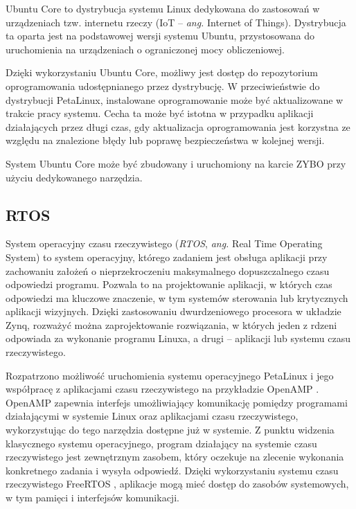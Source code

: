 Ubuntu Core to dystrybucja systemu Linux dedykowana do zastosowań w urządzeniach tzw. internetu rzeczy (IoT -- \emph{ang.} Internet of Things). %
Dystrybucja ta oparta jest na podstawowej wersji systemu Ubuntu, przystosowana do uruchomienia na urządzeniach o ograniczonej mocy obliczeniowej.

Dzięki wykorzystaniu Ubuntu Core, możliwy jest dostęp do repozytorium oprogramowania udostępnianego przez dystrybucję. 
W przeciwieństwie do dystrybucji PetaLinux, instalowane oprogramowanie może być aktualizowane w trakcie pracy systemu. 
Cecha ta może być istotna w przypadku aplikacji działających przez długi czas, gdy aktualizacja oprogramowania jest korzystna ze względu na znalezione błędy lub poprawę bezpieczeństwa w kolejnej wersji. %

System Ubuntu Core może być zbudowany i uruchomiony na karcie ZYBO przy użyciu dedykowanego narzędzia. \cite{ubuntu-core-zybo}

\subsection{RTOS}

System operacyjny czasu rzeczywistego (\emph{RTOS}, \emph{ang.} Real Time Operating System) to system operacyjny, którego zadaniem jest obsługa aplikacji przy zachowaniu założeń o nieprzekroczeniu maksymalnego dopuszczalnego czasu odpowiedzi programu. 
Pozwala to na projektowanie aplikacji, w których czas odpowiedzi ma kluczowe znaczenie, w tym systemów sterowania lub krytycznych aplikacji wizyjnych.
Dzięki zastosowaniu dwurdzeniowego procesora w układzie Zynq, rozważyć można zaprojektowanie rozwiązania, w których jeden z rdzeni odpowiada za wykonanie programu Linuxa, a drugi -- aplikacji lub systemu czasu rzeczywistego. %

Rozpatrzono możliwość uruchomienia systemu operacyjnego PetaLinux i jego współpracę z aplikacjami czasu rzeczywistego na przykładzie OpenAMP \cite{openamp-home}. 
OpenAMP zapewnia interfejs umożliwiający komunikację pomiędzy programami działającymi w systemie Linux oraz aplikacjami czasu rzeczywistego, wykorzystując do tego narzędzia dostępne już w systemie.
Z punktu widzenia klasycznego systemu operacyjnego, program działający na systemie czasu rzeczywistego jest zewnętrznym zasobem, który oczekuje na zlecenie wykonania konkretnego zadania i wysyła odpowiedź.
Dzięki wykorzystaniu systemu czasu rzeczywistego FreeRTOS \cite{freeRTOS-home}, aplikacje mogą mieć dostęp do zasobów systemowych, w tym pamięci i interfejsów komunikacji.

